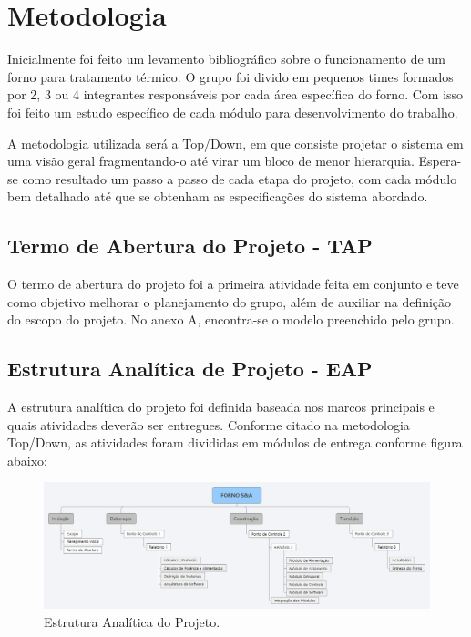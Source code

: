 \chapter[Metodologia]{Metodologia}

Inicialmente foi feito um levamento bibliográfico sobre o funcionamento de um forno para tratamento térmico. O grupo foi divido em pequenos times formados por 2, 3 ou 4 integrantes responsáveis por cada área específica do forno. Com isso foi feito um estudo específico de cada módulo para desenvolvimento do trabalho.

A metodologia utilizada será a Top/Down, em que consiste projetar o sistema em uma visão geral fragmentando-o até virar um bloco de menor hierarquia. Espera-se como resultado um passo a passo de cada etapa do projeto, com cada módulo bem detalhado até que se obtenham as especificações do sistema abordado.


\section{Termo de Abertura do Projeto - TAP}

O termo de abertura do projeto foi a primeira atividade feita em conjunto e teve como objetivo melhorar o planejamento do grupo, além de auxiliar na definição do escopo do projeto. No anexo A, encontra-se o modelo preenchido pelo grupo.

\section{Estrutura Analítica de Projeto - EAP}

A estrutura analítica do projeto foi definida baseada nos marcos principais e quais atividades deverão ser entregues. Conforme citado na metodologia Top/Down, as atividades foram divididas em módulos de entrega conforme figura abaixo:

\begin{figure}[ht]
	\centering
	\label{eap}
	\includegraphics[keepaspectratio=true,scale=0.3]{figuras/eap.jpg}
	\caption{Estrutura Analítica do Projeto.}
\end{figure}


